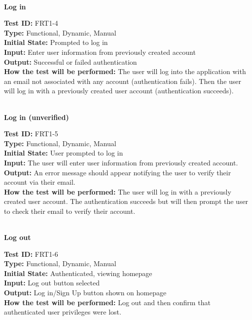 \documentclass[12pt,fleqn]{article}
\begin{document}
\newpage

\textbf{\\Log in}
\begin{tcolorbox}
\textbf{Test ID:} FRT1-4\\
\textbf{Type:} Functional, Dynamic, Manual\\
\textbf{Initial State:} Prompted to log in\\
\textbf{Input:} Enter user information from previously created account\\
\textbf{Output:} Successful or failed authentication\\
\textbf{How the test will be performed:} The user will log into the application with an email not associated with any account (authentication fails). Then the user will log in with a previously created user account (authentication succeeds). \\
\end{tcolorbox}

\textbf{\\Log in (unverified)}
\begin{tcolorbox}
\textbf{Test ID:} FRT1-5\\
\textbf{Type:} Functional, Dynamic, Manual\\
\textbf{Initial State:} User prompted to log in\\
\textbf{Input:} The user will enter user information from previously created account.\\
\textbf{Output:} An error message should appear notifying the user to verify their account via their email.\\
\textbf{How the test will be performed:} The user will log in with a previously created user account. The authentication succeeds but will then prompt the user to check their email to verify their account. \\
\end{tcolorbox} 

\textbf{\\Log out}
\begin{tcolorbox}
\textbf{Test ID:} FRT1-6\\
\textbf{Type:} Functional, Dynamic, Manual\\
\textbf{Initial State:} Authenticated, viewing homepage\\
\textbf{Input:} Log out button selected\\
\textbf{Output:} Log in/Sign Up button shown on homepage\\
\textbf{How the test will be performed:} Log out and then confirm that authenticated user privileges were lost. \\
\end{tcolorbox}
\end{document}
